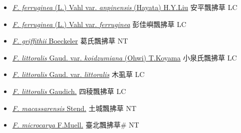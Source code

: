 \begin{itemize}
\begin{itemize}
        \item[] \href{http://www.theplantlist.org/tpl1.1/search?q=Fimbristylis+ferruginea+var.+anpinensis}{\textit{F. ferruginea} (L.) Vahl var. \textit{anpinensis} (Hayata) H.Y.Liu}   安平飄拂草 LC
        \item[] \href{http://www.theplantlist.org/tpl1.1/search?q=Fimbristylis+ferruginea+var.+ferruginea}{\textit{F. ferruginea} (L.) Vahl var. \textit{ferruginea}}   彭佳嶼飄拂草 LC
        \item[] \href{http://www.theplantlist.org/tpl1.1/search?q=Fimbristylis+griffithii}{\textit{F. griffithii} Boeckeler}   葛氏飄拂草 NT
        \item[] \href{http://www.theplantlist.org/tpl1.1/search?q=Fimbristylis+littoralis+var.+koidzumiana}{\textit{F. littoralis} Gaud. var. \textit{koidzumiana} (Ohwi) T.Koyama}   小泉氏飄拂草 LC
        \item[] \href{http://www.theplantlist.org/tpl1.1/search?q=Fimbristylis+littoralis+var.+littoralis}{\textit{F. littoralis} Gaud. var. \textit{littoralis}}   木虱草 LC
        \item[] \href{http://www.theplantlist.org/tpl1.1/search?q=Fimbristylis+littoralis}{\textit{F. littoralis} Gaudich.}     四稜飄拂草 LC
        \item[] \href{http://www.theplantlist.org/tpl1.1/search?q=Fimbristylis+macassarensis}{\textit{F. macassarensis} Stend.}   土城飄拂草 NT
        \item[] \href{http://www.theplantlist.org/tpl1.1/search?q=Fimbristylis+microcarya}{\textit{F. microcarya} F.Muell.}   臺北飄拂草\# NT

\end{itemize}
\end{itemize}
